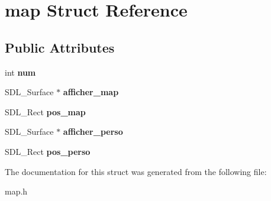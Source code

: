 \hypertarget{structmap}{}\section{map Struct Reference}
\label{structmap}
\subsection*{Public Attributes}
\begin{DoxyCompactItemize}
\item 
\mbox{\label{structmap_a56b034ffffc451092037f90fe6b87f3f}} 
int {\bfseries num}
\item 
\mbox{\label{structmap_a65e651a3045da495ef0890bd27ca22c0}} 
S\+D\+L\+\_\+\+Surface $\ast$ {\bfseries afficher\+\_\+map}
\item 
\mbox{\label{structmap_a892e2b0bcb168e8a85bd000b1bda0611}} 
S\+D\+L\+\_\+\+Rect {\bfseries pos\+\_\+map}
\item 
\mbox{\label{structmap_a0e322ac96ba8d343c516985a987caea1}} 
S\+D\+L\+\_\+\+Surface $\ast$ {\bfseries afficher\+\_\+perso}
\item 
\mbox{\label{structmap_a49128d68d1e6ea2af7bf0d137131da03}} 
S\+D\+L\+\_\+\+Rect {\bfseries pos\+\_\+perso}
\end{DoxyCompactItemize}


The documentation for this struct was generated from the following file\+:\begin{DoxyCompactItemize}
\item 
map.\+h\end{DoxyCompactItemize}
